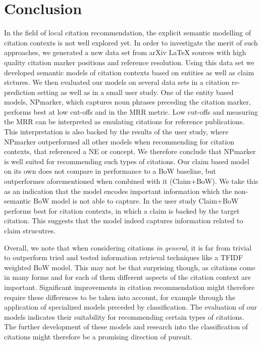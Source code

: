 \chapter{Conclusion}\label{chap:conclusion}
In the field of local citation recommendation, the explicit semantic modelling of citation contexts is not well explored yet. In order to investigate the merit of such approaches, we generated a new data set from arXiv \LaTeX{} sources with high quality citation marker positions and reference resolution. Using this data set we developed semantic models of citation contexts based on entities as well as claim stctures. We then evaluated our models on several data sets in a citation re-prediction setting as well as in a small user study. One of the entity based models, NPmarker, which captures noun phrases preceding the citation marker, performs best at low cut-offs and in the MRR metric. Low cut-offs and measuring the MRR can be interpreted as emulating citations for reference publications. This interpretation is also backed by the results of the user study, where NPmarker outperformed all other models when recommending for citation contexts, that referenced a NE or concept. We therefore conclude that NPmarker is well suited for recommending such types of citations. Our claim based model on its own does not compare in performance to a BoW baseline, but outperformes aforementioned when combined with it (Claim+BoW). We take this as an indication that the model encodes important information which the non-semantic BoW model is not able to capture. In the user study Claim+BoW performs best for citation contexts, in which a claim is backed by the target citation. This suggests that the model indeed captures information related to claim strucutres.

Overall, we note that when considering citations \emph{in general}, it is far from trivial to outperform tried and tested information retrieval techniques like a TFIDF weighted BoW model. This may not be that surprising though, as citations come in many forms and for each of them different aspects of the citation context are important. Significant improvements in citation recommendation might therefore require these differences to be taken into account, for example through the application of specialized models preceded by classification. The evaluation of our models indicates their suitability for recommending certain types of citations. The further development of these models and research into the classification of citations might therefore be a promising direction of pursuit.
